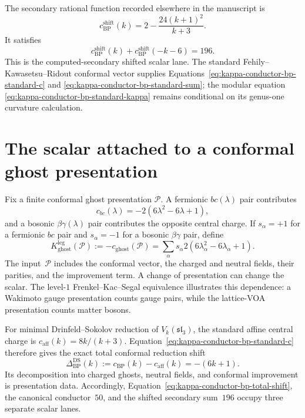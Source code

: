 The secondary rational function recorded elsewhere in the manuscript is
\[
 c_{\mathrm{BP}}^{\mathrm{shift}}(k)
 =2-\frac{24(k+1)^2}{k+3}.
\]
It satisfies
\begin{equation}
 \label{eq:kappa-conductor-bp-shifted-sum}
 c_{\mathrm{BP}}^{\mathrm{shift}}(k)
 +c_{\mathrm{BP}}^{\mathrm{shift}}(-k-6)=196.
\end{equation}
This is the computed-secondary shifted scalar lane.  The standard
Fehily--Kawasetsu--Ridout conformal vector supplies
Equations~\eqref{eq:kappa-conductor-bp-standard-c} and
\eqref{eq:kappa-conductor-bp-standard-sum}; the modular equation
\eqref{eq:kappa-conductor-bp-standard-kappa} remains conditional on its
genus-one curvature calculation.

\section{The scalar attached to a conformal ghost presentation}
\label{sec:conductor-ghost-charge}

Fix a finite conformal ghost presentation $\mathcal P$.  A fermionic
$bc(\lambda)$ pair contributes
\[
 c_{bc}(\lambda)=-2(6\lambda^2-6\lambda+1),
\]
and a bosonic $\beta\gamma(\lambda)$ pair contributes the opposite
central charge.  If $s_\alpha=+1$ for a fermionic $bc$ pair and
$s_\alpha=-1$ for a bosonic $\beta\gamma$ pair, define
\begin{equation}
 \label{eq:kappa-conductor-ghost-definition}
 K_{\mathrm{ghost}}^{\mathrm{leg}}(\mathcal P)
 :=-c_{\mathrm{ghost}}(\mathcal P)
 =\sum_\alpha s_\alpha
 2(6\lambda_\alpha^2-6\lambda_\alpha+1).
\end{equation}
The input~$\mathcal P$ includes the conformal vector, the charged and
neutral fields, their parities, and the improvement term.  A change of
presentation can change the scalar.  The level-$1$
Frenkel--Kac--Segal equivalence illustrates this dependence: a
Wakimoto gauge presentation counts gauge pairs, while the lattice-VOA
presentation counts matter bosons.

For minimal Drinfeld--Sokolov reduction of
$V_k(\mathfrak{sl}_3)$, the standard affine central charge is
$c_{\mathrm{aff}}(k)=8k/(k+3)$.  Equation~\eqref{eq:kappa-conductor-bp-standard-c}
therefore gives the exact total conformal reduction shift
\begin{equation}
 \label{eq:kappa-conductor-bp-total-shift}
 \Delta^{\mathrm{DS}}_{\mathrm{BP}}(k)
 :=c_{\mathrm{BP}}(k)-c_{\mathrm{aff}}(k)
 =-(6k+1).
\end{equation}
Its decomposition into charged ghosts, neutral fields, and conformal
improvement is presentation data.  Accordingly,
Equation~\eqref{eq:kappa-conductor-bp-total-shift}, the canonical
conductor~$50$, and the shifted secondary sum~$196$ occupy three
separate scalar lanes.

